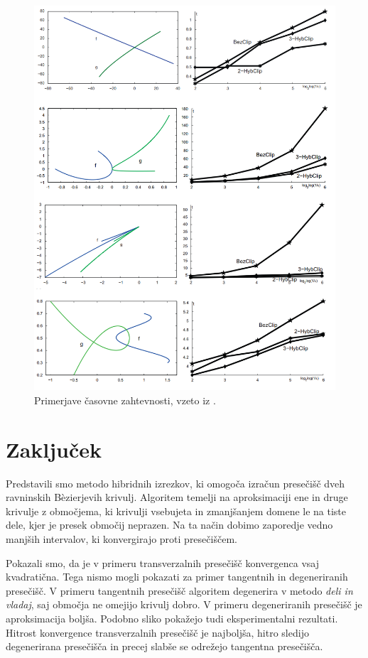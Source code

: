 \documentclass[12pt,a4paper, reqno]{amsart}
\begin{document}
\begin{figure}[!h]
  \begin{center}
    \includegraphics[width=0.9\linewidth]{primeri}
  \caption{Primerjave časovne zahtevnosti, vzeto iz \cite{hyb_clip}.}
  \label{fig:primeri}
  \end{center}
  
\end{figure}

\section{Zaključek}
Predstavili smo metodo hibridnih izrezkov, ki omogoča izračun presečišč dveh ravninskih B\`{e}zierjevih krivulj. Algoritem temelji na aproksimaciji ene in druge krivulje z območjema, ki krivulji vsebujeta in zmanjšanjem domene le na tiste dele, kjer je presek območij neprazen. Na ta način dobimo zaporedje vedno manjših intervalov, ki konvergirajo proti presečiščem.

Pokazali smo, da je v primeru transverzalnih presečišč konvergenca vsaj kvadratična. Tega nismo mogli pokazati za primer tangentnih in degeneriranih presečišč. V primeru tangentnih presečišč algoritem degenerira v metodo {\em deli in vladaj}, saj območja ne omejijo krivulj dobro. V primeru degeneriranih presečišč je aproksimacija boljša.
Podobno sliko pokažejo tudi eksperimentalni rezultati. Hitrost konvergence transverzalnih presečišč je najboljša, hitro sledijo degenerirana presečišča in precej slabše se odrežejo tangentna presečišča.
\end{document}
